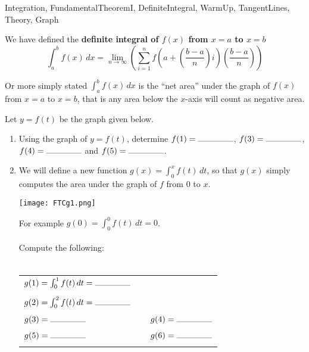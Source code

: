 \begin{tagblock}{Integration, FundamentalTheoremI, DefiniteIntegral, WarmUp, TangentLines, Theory, Graph}
\begin{question}

We have defined the \textbf{definite integral of $f(x)$ from $x=a$ to $x=b$} 
\[ \int_a^b f(x) \, dx = \lim_{n \to \infty}( \sum_{i=1}^n f(a+ (\frac{b-a}{n}) i )(\frac{b-a}{n})) \]

Or more simply stated $\int_a^b f(x) \, dx$ is the ``net area'' under the graph of $f(x)$ from $x=a$ to $x=b$, that is any area below the $x$-axis will count as negative area.  

\bigskip


Let $y=f(t)$ be the graph given below. 
\begin{enumerate}
\item Using the graph of $y=f(t)$, determine $f(1) =   \rule{1.5cm}{.1mm}$, $f(3) =   \rule{1.5cm}{.1mm}$, $f(4) =   \rule{1.5cm}{.1mm}$ and $f(5) =   \rule{1.5cm}{.1mm}$.  



 \item We will define a new function $g(x) = \int_0^x f(t) \, dt$, so that $g(x)$ simply computes the area under the graph of $f$ from $0$ to $x$.  \\ 

\begin{minipage}{.4\textwidth}
\texttt{[image: FTCg1.png]}\end{minipage}%
\begin{minipage}{.6\textwidth}
For example $g(0) = \int_0^0 f(t) \, dt = 0$.  \\ \\ Compute the following:  \\ \\
\begin{tabular}{lll}
 $g(1) = \int_0^1 f(t) \, dt =   \rule{1.5cm}{.1mm}$ &\hspace{.2in} \\ \\
  $g(2) =  \int_0^2 f(t) \, dt =   \rule{1.5cm}{.1mm}$ \\ \\
$g(3) =  \rule{1.5cm}{.1mm}$ &\hspace{.2in} & $g(4) =  \rule{1.5cm}{.1mm}$ \\ \\ 
$g(5) =  \rule{1.5cm}{.1mm}$ &\hspace{.2in} & $g(6) =  \rule{1.5cm}{.1mm}$ \\ \\ 
 \end{tabular}
\end{minipage}


\end{enumerate}
\end{question}
\end{tagblock}
